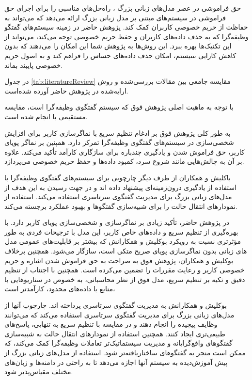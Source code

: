 حق فراموشی در عصر مدل‌های زبانی بزرگ 
\cite{zhang2024right}
، راه‌حل‌های مناسبی را برای اجرای حق فراموشی در سیستم‌های مبتنی بر مدل‌ زبانی بزرگ ارائه می‌دهد که می‌تواند به حفاظت از حریم خصوصی کاربران کمک کند. پژوهش حاضر در زمینه سیستم‌های گفتگو وظیفه‌گرا که به حذف داده‌های کاربران و حفظ حریم خصوصی توجه می‌کند، می‌تواند از این تکنیک‌ها بهره ببرد. این روش‌ها به پژوهش شما این امکان را می‌دهند که بدون کاهش کارایی سیستم، امکان حذف داده‌های حساس را فراهم کند و به اصول حریم خصوصی پایبند بماند.


در جدول%
\ref{tab:literatureReview}
مقایسه جامعی بین مقالات بررسی‌شده و روش ارایه‌شده در پژوهش حاضر آورده شده‌است.

 
   

با توجه به ماهیت اصلی پژوهش فوق که سیستم گفتگوی وظیفه گرا است، مقایسه مستقیمی با 
\cite{bocklisch2024task}
انجام شده است.

به طور کلی پژوهش فوق بر ادغام تنظیم سریع با نماگرسازی کاربر برای افزایش شخصی‌سازی در سیستم‌های گفتگوی وظیفه‌گرا تمرکز دارد. همپنین بر نماگر پویای کاربر، حق فراموش شدن و یادگیری چندباره برای سازگاری کارآمد تأکید می‌کند. علاوه بر آن به چالش‌هایی مانند شروع سرد، کمبود داده‌ها و حفظ حریم خصوصی می‌پردازد.

باکلیش و همکاران از طرف دیگر چارچوبی برای سیستم‌های گفتگوی وظیفه‌گرا با استفاده از یادگیری درون‌زمینه‌ای پیشنهاد داده اند و در جهت رسیدن به این هدف از مدل‌های زبانی بزرگ برای مدیریت گفتگوی سرتاسری استفاده می‌کند. استفاده از نمودارهای انتقال حالت را برای شبیه‌سازی گفتگوها و بهبود عملکرد برجسته می‌کند.


در پژوهش حاضر، تأکید زیادی بر نماگرسازی و شخصی‌سازی پویای کاربر دارد. با بهره‌گیری از تنظیم سریع و داده‌های خاص کاربر، این مدل با ترجیحات فردی به طور مؤثرتری نسبت به رویکرد بوکلیش و همکارانش که بیشتر بر قابلیت‌های عمومی مدل های زبانی بدون نماگرسازی پویای صریح متکی است، سازگار می‌شود. همچنین برخلاف بوکلیش و همکاران، پژوهش فوق به صراحت به حق فراموش شدن اشاره  و حریم خصوصی کاربر و رعایت مقررات را تضمین می‌کرده است. همچنین با اجتناب از تنظیم دقیق و تکیه بر تنظیم سریع، مدل فوق از نظر محاسباتی، به خصوص در سناریوهایی با منابع یا داده‌های محدود، کارآمدتر است،


بوکلیش و همکارانش به مدیریت گفتگوی سرتاسری پرداخته اند. چارچوب آنها از مدل‌های زبانی بزرگ برای مدیریت گفتگوی سرتاسری استفاده می‌کند که می‌توانند وظایف پیچیده را انجام دهند و در مقایسه با تنظیم سریع به تنهایی، پاسخ‌های طبیعی‌تری ایجاد کنند. همچنین استفاده از نمودارهای انتقال حالت به شبیه‌سازی گفتگوهای واقع‌گرایانه و مدیریت سیستماتیک‌تر تعاملات وظیفه‌گرا کمک می‌کند، که ممکن است منجر به گفتگوهای ساختاریافته‌تر شود. استفاده از مدل های زبانی بزرگ از پیش آموزش‌دیده به سیستم آنها اجازه می‌دهد تا به راحتی در دامنه‌ها و زبان‌های مختلف مقیاس‌پذیر شود.


